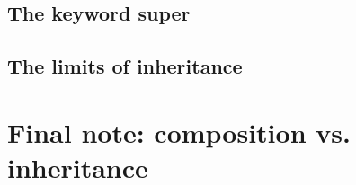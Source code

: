 \subsection{The keyword super}
\label{sec:keyword-super}


\subsection{The limits of inheritance}
\label{sec:limits-inheritance}


\section{Final note: composition vs. inheritance}
\label{sec:final-note:-comp}


